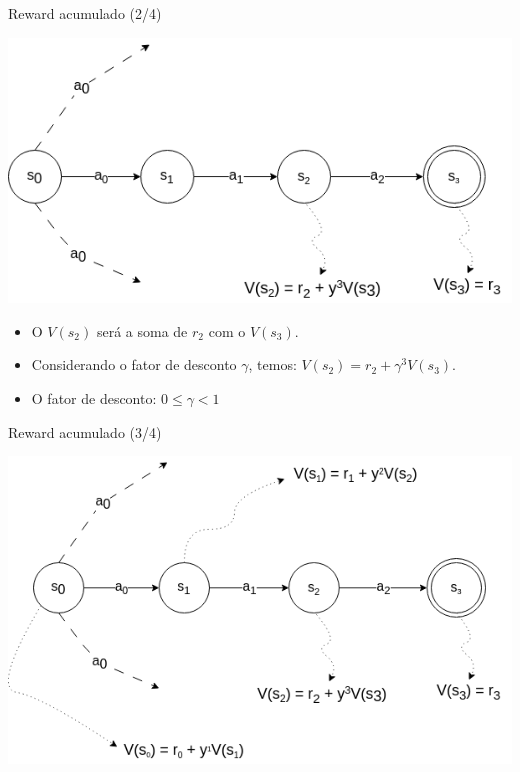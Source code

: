 \documentclass{beamer}
\begin{document}
\begin{frame}{Reward acumulado (2/4)}
	
	\begin{center}
		\includegraphics[width=.8\textwidth]{figuras/grafo_rewards_2.png}
	\end{center}
	
	\begin{itemize}	
		\item O $V(s_{2})$ será a soma de $r_{2}$ com o $V(s_{3})$. 
		\item Considerando o fator de desconto $\gamma$, temos: $V(s_{2}) = r_{2} + \gamma^{3} V(s_{3}) $.
		\item O fator de desconto: $0 \leq \gamma < 1$ 
	\end{itemize}
	
\end{frame}

\begin{frame}{Reward acumulado (3/4)}
	
	\begin{center}
		\includegraphics[width=.9\textwidth]{figuras/grafo_rewards_3.png}
	\end{center}
	
\end{frame}
\end{document}
